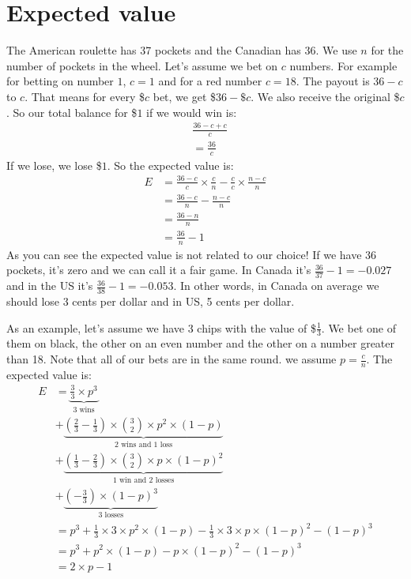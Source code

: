 \documentclass{book}
\begin{document}
	\section{Expected value}
	The American roulette has 37 pockets and the Canadian has 36. We use $n$ for the number of pockets in the wheel. Let's assume we bet on $c$ numbers. For example for betting on number $1$, $c = 1$ and for a red number $c = 18$. The payout is $36 - c$ to $c$. That means for every \$$c$ bet, we get \$$36 - \$c$. We also receive the original \$$c$. So our total balance for \$$1$ if we would win is:
	\begin{equation*}
		\begin{split}
			&\frac{36 - c + c}{c} \\
			&= \frac{36}{c}
		\end{split}
	\end{equation*}
	If we lose, we lose \$$1$. So the expected value is:
	\begin{equation*}
		\begin{split}
			E &= \frac{36 - c}{c} \times \frac{c}{n} - \frac{c}{c} \times \frac{n - c}{n} \\
			&= \frac{36 - c}{n} - \frac{n - c}{n} \\
			&= \frac{36 - n}{n} \\
			&= \frac{36}{n} - 1
		\end{split}
	\end{equation*}
	As you can see the expected value is not related to our choice! If we have 36 pockets, it's zero and we can call it a fair game. In Canada it's $\frac{36}{37} - 1 = -0.027$ and in the US it's $\frac{36}{38} - 1 = -0.053$. In other words, in Canada on average we should lose 3 cents per dollar and in US, 5 cents per dollar.
	\par As an example, let's assume we have 3 chips with the value of \$$\frac{1}{3}$. We bet one of them on black, the other on an even number and the other on a number greater than 18. Note that all of our bets are in the same round. we assume $p = \frac{c}{n}$. The expected value is:
	\begin{equation*}
		\begin{split}
			E &= \underbrace{\frac{3}{3} \times p^3}_{\text{3 wins}} \\
			  &+ \underbrace{(\frac{2}{3} - \frac{1}{3}) \times \binom{3}{2} \times p^2 \times (1 - p)}_{\text{2 wins and 1 loss}} \\
			  &+ \underbrace{(\frac{1}{3} - \frac{2}{3}) \times \binom{3}{2} \times p \times (1 - p)^2}_{\text{1 win and 2 losses}} \\
			  &+ \underbrace{(-\frac{3}{3}) \times (1 - p)^3}_{\text{3 losses}} \\
			  &= p^3 + \frac{1}{3} \times 3 \times p^2 \times (1 - p) - \frac{1}{3} \times 3 \times p \times (1 - p)^2 - (1 - p)^3 \\
			  &= p^3 + p^2 \times (1 - p) - p \times (1 - p)^2 - (1 - p)^3 \\
			  &= 2 \times p - 1
		\end{split}
	\end{equation*}
\end{document}
